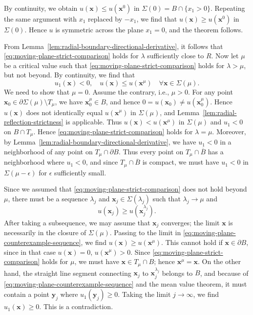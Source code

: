 By continuity, we obtain $u(\bm{x})\leq u(\bm{x}^0)$ in $\Sigma(0)=B\cap\{x_1>0\}$. Repeating the same argument with $x_1$ replaced by $-x_1$, we find that $u(\bm{x})\geq u(\bm{x}^0)$ in $\Sigma(0)$. Hence $u$ is symmetric across the plane $x_1=0$, and the theorem follows.

\begin{Proof}
From Lemma~\ref{lem:radial-boundary-directional-derivative}, it follows that \eqref{eq:moving-plane-strict-comparison} holds for $\lambda$ sufficiently close to $R$. Now let $\mu$ be a critical value such that \eqref{eq:moving-plane-strict-comparison} holds for $\lambda>\mu$, but not beyond. By continuity, we find that
\begin{equation}\label{eq:moving-plane-critical-comparison}
u_1(\bm{x})<0,\quad u(\bm{x})\leq u(\bm{x}^\mu)\quad\forall\bm{x}\in\Sigma(\mu).
\end{equation}
We need to show that $\mu=0$. Assume the contrary, i.e., $\mu>0$. For any point $\bm{x}_0\in\partial\Sigma(\mu)\setminus T_\mu$, we have $\bm{x}_0^\mu\in B$, and hence $0=u(\bm{x}_0)\ne u(\bm{x}_0^\mu)$. Hence $u(\bm{x})$ does not identically equal $u(\bm{x}^\mu)$ in $\Sigma(\mu)$, and Lemma~\ref{lem:radial-reflection-strictness} is applicable. Thus $u(\bm{x})<u(\bm{x}^\mu)$ in $\Sigma(\mu)$ and $u_1<0$ on $B\cap T_\mu$. Hence \eqref{eq:moving-plane-strict-comparison} holds for $\lambda=\mu$. Moreover, by Lemma~\ref{lem:radial-boundary-directional-derivative}, we have $u_1<0$ in a neighborhood of any point on $T_\mu\cap\partial B$. Thus every point on $T_\mu\cap\overline B$ has a neighborhood where $u_1<0$, and since $T_\mu\cap\overline B$ is compact, we must have $u_1<0$ in $\Sigma(\mu-\epsilon)$ for $\epsilon$ sufficiently small.

Since we assumed that \eqref{eq:moving-plane-strict-comparison} does not hold beyond $\mu$, there must be a sequence $\lambda_j$ and $\bm{x}_j\in\Sigma(\lambda_j)$ such that $\lambda_j\to\mu$ and
\begin{equation}\label{eq:moving-plane-counterexample-sequence}
u(\bm{x}_j)\geq u(\bm{x}_j^{\lambda_j}).
\end{equation}
After taking a subsequence, we may assume that $\bm{x}_j$ converges; the limit $\bm{x}$ is necessarily in the closure of $\Sigma(\mu)$. Passing to the limit in \eqref{eq:moving-plane-counterexample-sequence}, we find $u(\bm{x})\geq u(\bm{x}^\mu)$. This cannot hold if $\bm{x}\in\partial B$, since in that case $u(\bm{x})=0$, $u(\bm{x}^\mu)>0$. Since \eqref{eq:moving-plane-strict-comparison} holds for $\mu$, we must have $\bm{x}\in T_\mu\cap B$; hence $\bm{x}^\mu=\bm{x}$. On the other hand, the straight line segment connecting $\bm{x}_j$ to $\bm{x}_j^{\lambda_j}$ belongs to $B$, and because of \eqref{eq:moving-plane-counterexample-sequence} and the mean value theorem, it must contain a point $\bm{y}_j$ where $u_1(\bm{y}_j)\geq0$. Taking the limit $j\to\infty$, we find $u_1(\bm{x})\geq0$. This is a contradiction.
\end{Proof}

